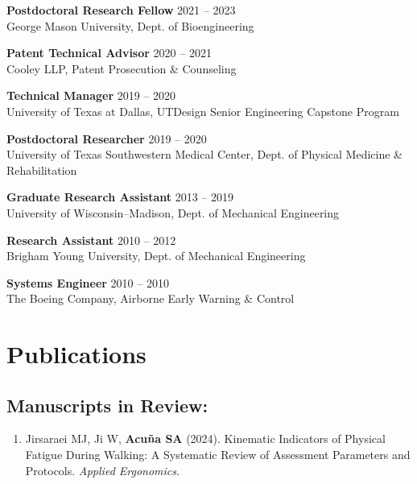 \documentclass[letterpaper, 10pt]{article}
\begin{document}
\textbf{Postdoctoral Research Fellow}
\hfill 2021 -- 2023\\ %
George Mason University, Dept. of Bioengineering
\medskip

\textbf{Patent Technical Advisor}
\hfill 2020 -- 2021\\ %
Cooley LLP, Patent Prosecution \& Counseling %
\medskip

\textbf{Technical Manager}
\hfill 2019 -- 2020\\ %
University of Texas at Dallas, UTDesign Senior Engineering Capstone Program %
\medskip

\textbf{Postdoctoral Researcher}
\hfill 2019 -- 2020\\ %
University of Texas Southwestern Medical Center, Dept. of Physical Medicine \& Rehabilitation %
\medskip

\textbf{Graduate Research Assistant}
\hfill 2013 -- 2019\\ %
University of Wisconsin–Madison, Dept. of Mechanical Engineering  %
\medskip

\textbf{Research Assistant}
\hfill 2010 -- 2012\\ %
Brigham Young University, Dept. of Mechanical Engineering %
\medskip

\textbf{Systems Engineer}
\hfill 2010 -- 2010\\ %
The Boeing Company, Airborne Early Warning \& Control %

\section{Publications}

\subsection{Manuscripts in Review:}
\begin{enumerate}
     \item Jirsaraei MJ, Ji W, \textbf{Acuña SA} (2024). Kinematic Indicators of Physical Fatigue During Walking: A Systematic Review of Assessment Parameters and Protocols. \textit{Applied Ergonomics}.
\end{enumerate}
\end{document}
